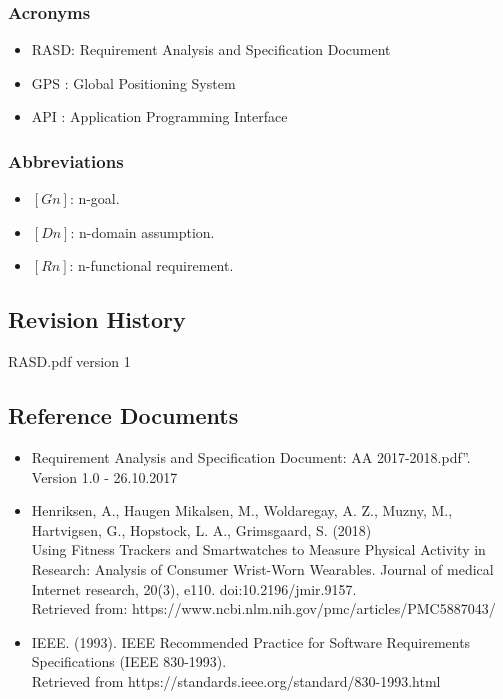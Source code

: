 \documentclass[12pt]{article}
\begin{document}
\subsubsection{Acronyms}
\begin{itemize}
\item{} RASD: Requirement Analysis and Specification Document
\item{} GPS : Global Positioning System
\item{} API : Application Programming Interface

\end{itemize}

\subsubsection{Abbreviations}
\begin{itemize}
\item $[Gn]$: n-goal. 
\item $[Dn]$: n-domain assumption. 
\item $[Rn]$: n-functional requirement. 

\end{itemize}
\subsection{Revision History}
RASD.pdf version 1
\subsection{Reference Documents}
\begin{itemize}
\item Requirement Analysis and Specification Document: AA 2017-2018.pdf”. Version 1.0 - 26.10.2017
\item Henriksen, A., Haugen Mikalsen, M., Woldaregay, A. Z., Muzny, M., Hartvigsen, G., Hopstock, L. A., Grimsgaard, S. (2018)
\\Using Fitness Trackers and Smartwatches to Measure Physical Activity in Research: Analysis of Consumer Wrist-Worn Wearables. Journal of medical Internet research, 20(3), e110. doi:10.2196/jmir.9157. 
\\Retrieved from: https://www.ncbi.nlm.nih.gov/pmc/articles/PMC5887043/
\item IEEE. (1993). IEEE Recommended Practice for Software Requirements Specifications (IEEE 830-1993). 
\\Retrieved from https://standards.ieee.org/standard/830-1993.html


\end{itemize}
\end{document}
